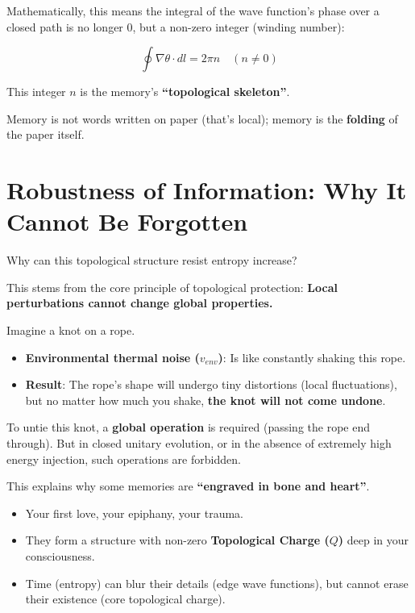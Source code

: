 Mathematically, this means the integral of the wave function's phase over a closed path is no longer 0, but a non-zero integer (winding number):

\[\oint \nabla \theta \cdot dl = 2\pi n \quad (n \neq 0)\]

This integer $n$ is the memory's \textbf{``topological skeleton''}.

Memory is not words written on paper (that's local); memory is the \textbf{folding} of the paper itself.

\section{Robustness of Information: Why It Cannot Be Forgotten}

Why can this topological structure resist entropy increase?

This stems from the core principle of topological protection: \textbf{Local perturbations cannot change global properties.}

Imagine a knot on a rope.

\begin{itemize}
\item \textbf{Environmental thermal noise ($v_{env}$)}: Is like constantly shaking this rope.

\item \textbf{Result}: The rope's shape will undergo tiny distortions (local fluctuations), but no matter how much you shake, \textbf{the knot will not come undone}.
\end{itemize}

To untie this knot, a \textbf{global operation} is required (passing the rope end through). But in closed unitary evolution, or in the absence of extremely high energy injection, such operations are forbidden.

This explains why some memories are \textbf{``engraved in bone and heart''}.

\begin{itemize}
\item Your first love, your epiphany, your trauma.

\item They form a structure with non-zero \textbf{Topological Charge ($Q$)} deep in your consciousness.

\item Time (entropy) can blur their details (edge wave functions), but cannot erase their existence (core topological charge).
\end{itemize}

